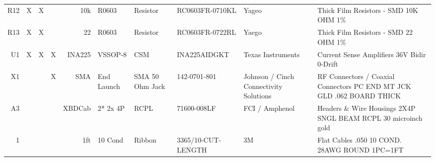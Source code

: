 \documentclass[twoside,11pt]{cergdoc}
\begin{document}
\begin{appendix}
\begin{table}
\begin{tabular}{r|ccc|rlllp{2.5cm}p{6.5cm}}
R12  & X & X &   & 10k & R0603 & Resistor & RC0603FR-0710KL & Yageo & Thick Film Resistors - SMD 10K OHM 1\%   \\
R13  & X & X &   & 22 & R0603 & Resistor & RC0603FR-0722RL & Yaego & Thick Film Resistors - SMD 22 OHM 1\%   \\
U1   & X & X & X & INA225 & VSSOP-8 & CSM & INA225AIDGKT & Texas Instruments & Current Sense Amplifiers 36V Bidir 0-Drift \\
X1   &   &   & X & SMA & End Launch & SMA 50 Ohm Jack & 142-0701-801  & Johnson / Cinch Connectivity Solutions  & RF Connectors / Coaxial Connectors PC END MT JCK GLD .062 BOARD THICK    \\ \hline
A3   &   &   &   & XBDCab & 2* 2x 4P & RCPL  & 71600-008LF & FCI / Amphenol & Headers  \&  Wire Housings 2X4P SNGL BEAM RCPL 30 microinch gold   \\
1    &   &   &   & 1ft & 10 Cond & Ribbon & 3365/10-CUT-LENGTH & 3M & Flat Cables .050 10 COND. 28AWG ROUND 1PC=1FT   \\
  \end{tabular}
  \setcounter{footnote}{0}
\end{table}

\end{appendix}
\end{document}
